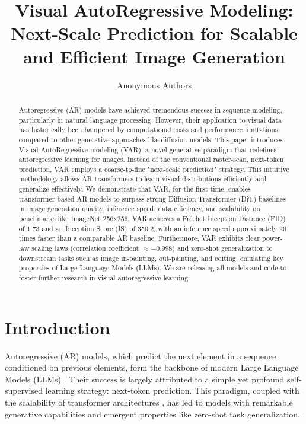 \documentclass{article}
\title{Visual AutoRegressive Modeling: Next-Scale Prediction for Scalable and Efficient Image Generation}
\author{%
  Anonymous Authors \\
}
\begin{document}
\maketitle

\begin{abstract}
Autoregressive (AR) models have achieved tremendous success in sequence modeling, particularly in natural language processing. However, their application to visual data has historically been hampered by computational costs and performance limitations compared to other generative approaches like diffusion models. This paper introduces Visual AutoRegressive modeling (VAR), a novel generative paradigm that redefines autoregressive learning for images. Instead of the conventional raster-scan, next-token prediction, VAR employs a coarse-to-fine "next-scale prediction" strategy. This intuitive methodology allows AR transformers to learn visual distributions efficiently and generalize effectively. We demonstrate that VAR, for the first time, enables transformer-based AR models to surpass strong Diffusion Transformer (DiT) baselines in image generation quality, inference speed, data efficiency, and scalability on benchmarks like ImageNet 256x256. VAR achieves a Fréchet Inception Distance (FID) of 1.73 and an Inception Score (IS) of 350.2, with an inference speed approximately 20 times faster than a comparable AR baseline. Furthermore, VAR exhibits clear power-law scaling laws (correlation coefficient $\approx -0.998$) and zero-shot generalization to downstream tasks such as image in-painting, out-painting, and editing, emulating key properties of Large Language Models (LLMs). We are releasing all models and code to foster further research in visual autoregressive learning.
\end{abstract}

\section{Introduction}
\label{sec:introduction}

Autoregressive (AR) models, which predict the next element in a sequence conditioned on previous elements, form the backbone of modern Large Language Models (LLMs) \cite{brown2020language}. %
Their success is largely attributed to a simple yet profound self-supervised learning strategy: next-token prediction. This paradigm, coupled with the scalability of transformer architectures \cite{vaswani2017attention}, has led to models with remarkable generative capabilities and emergent properties like zero-shot task generalization.
\end{document}
